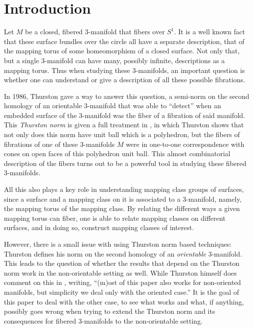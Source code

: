 \section{Introduction}
\label{sec:introduction}

Let $M$ be a closed, fibered 3-manifold that fibers over $S^1$. It is a well known fact that these surface
bundles over the circle all have a separate description, that of the mapping torus of some homeomorphism of a
closed surface. Not only that, but a single 3-manifold can have many, possibly infinite, descriptions as a
mapping torus. Thus when studying these 3-manifolds, an important question is whether one can understand or
give a description of all these possible fibrations.

In 1986, Thurston gave a way to answer this question, a semi-norm on the second homology of an orientable
3-manifold that was able to ``detect'' when an embedded surface of the 3-manifold was the fiber of a fibration
of said manifold. This \textit{Thurston norm} is given a full treatment in \cite{thurston1986norm}, in which
Thurston shows that not only does this norm have unit ball which is a polyhedron, but the fibers of fibrations
of one of these 3-manifolds $M$ were in one-to-one correspondence with cones on open faces of this polyhedron
unit ball. This almost combinatorial description of the fibers turns out to be a powerful tool in studying
these fibered 3-manifolds.

All this also plays a key role in understanding mapping class groups of surfaces, since a surface and
a mapping class on it is associated to a $3$-manifold, namely, the mapping torus of the mapping class.
By relating the different ways a given mapping torus can fiber, one is able to relate mapping classes
on different surfaces, and in doing so, construct mapping classes of interest.

However, there is a small issue with using Thurston norm based techniques: Thurston defines his norm on the
second homology of an \textit{orientable} 3-manifold. This leads to the question of whether the results that
depend on the Thurston norm work in the non-orientable setting as well. While Thurston himself does comment on
this in \cite{thurston1986norm}, writing, ``(m)ost of this paper also works for non-oriented manifolds, but
simplicity we deal only with the oriented case.'' It is the goal of this paper to deal with the other case, to
see what works and what, if anything, possibly goes wrong when trying to extend the Thurston norm and its
consequences for fibered 3-manifolds to the non-orientable setting.

